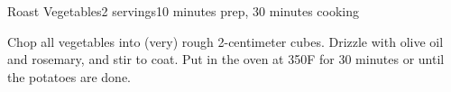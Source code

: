 \documentclass[../Cookbook.tex]{subfiles}
\begin{document}
\begin{recipe}{Roast Vegetables}{2 servings}{10 minutes prep, 30 minutes cooking}

Chop all vegetables into (very) rough 2-centimeter cubes. Drizzle with olive oil and rosemary, and stir to coat. Put in the oven at 350\0F for 30 minutes or until the potatoes are done.

\end{recipe}
\end{document}
